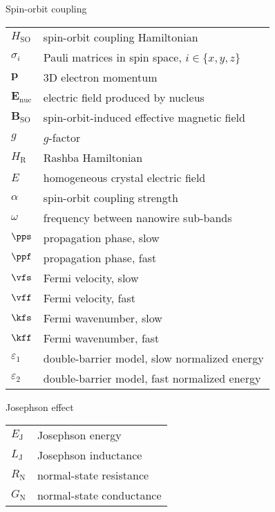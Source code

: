 {\Large\noindent Spin-orbit coupling}
\vspace{-.2cm}
\begin{longtable}{ m{5em} m{29em}}
$H_\mathrm{SO}$ & spin-orbit coupling Hamiltonian \\
$\sigma_i$ & Pauli matrices in spin space, $i \in \{x, y, z\}$ \\
$\mathbf{p}$ & 3D electron momentum \\
$\mathbf{E_\mathrm{nuc}}$ & electric field produced by nucleus \\
$\mathbf{B}_\mathrm{SO}$ & spin-orbit-induced effective magnetic field \\
$g$ & $g$-factor \\
$H_\mathrm{R}$ & Rashba Hamiltonian \\
$E$ & homogeneous crystal electric field \\
$\alpha$ & spin-orbit coupling strength \\
$\omega$ & frequency between nanowire sub-bands \\
$\pps$ & propagation phase, slow \\
$\ppf$ & propagation phase, fast \\
$\vfs$ & Fermi velocity, slow \\
$\vff$ & Fermi velocity, fast \\
$\kfs$ & Fermi wavenumber, slow \\
$\kff$ & Fermi wavenumber, fast \\
$\varepsilon_\mathrm{1}$ & double-barrier model, slow normalized energy \\
$\varepsilon_\mathrm{2}$ & double-barrier model, fast normalized energy \\
\end{longtable}
\vspace{.2cm}

{\Large\noindent Josephson effect}
\vspace{-.2cm}
\begin{longtable}{ m{5em} m{29em}}
$E_\mathrm{J}$ & Josephson energy \\
$L_\mathrm{J}$ & Josephson inductance \\
$R_\mathrm{N}$ & normal-state resistance \\
$G_\mathrm{N}$ & normal-state conductance \\
\end{longtable}
\vspace{.2cm}


\renewcommand{\arraystretch}{1}
